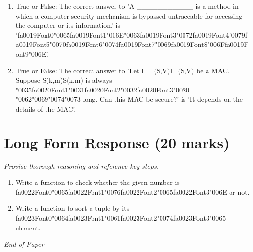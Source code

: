 \documentclass[12pt]{article}
\begin{document}
\begin{enumerate}[label=\arabic*.]
\item True or False: The correct answer to 'A \_\_\_\_\_\_\_\_\_\_\_ is a method in which a computer security mechanism is bypassed untraceable for accessing the computer or its information.' is '{\csname fa0019Font0\endcsname\char"0065}{\csname fa0019Font1\endcsname\char"006E}{\char"0063}{\csname fa0019Font3\endcsname\char"0072}{\csname fa0019Font4\endcsname\char"0079}{\csname fa0019Font5\endcsname\char"0070}{\csname fa0019Font6\endcsname\char"0074}{\csname fa0019Font7\endcsname\char"0069}{\csname fa0019Font8\endcsname\char"006F}{\csname fa0019Font9\endcsname\char"006E}'.
\item True or False: The correct answer to 'Let I = (S,V)I=(S,V) be a MAC. Suppose S(k,m)S(k,m) is always {\char"0035}{\csname fa0020Font1\endcsname\char"0031}{\csname fa0020Font2\endcsname\char"0032}{\csname fa0020Font3\endcsname\char"0020} {\char"0062}{\char"0069}{\char"0074}{\char"0073} long. Can this MAC be secure?' is 'It depends on the details of the MAC'.
\end{enumerate}

\section*{Long Form Response (20 marks)}
\textit{Provide thorough reasoning and reference key steps.}
\begin{enumerate}[label=\arabic*.]
\item Write a function to check whether the given number is {\csname fa0022Font0\endcsname\char"0065}{\csname fa0022Font1\endcsname\char"0076}{\csname fa0022Font2\endcsname\char"0065}{\csname fa0022Font3\endcsname\char"006E} or not.
\item Write a function to sort a tuple by its {\csname fa0023Font0\endcsname\char"0064}{\csname fa0023Font1\endcsname\char"0061}{\csname fa0023Font2\endcsname\char"0074}{\csname fa0023Font3\endcsname\char"0065} element.
\end{enumerate}

\vfill
\noindent\textit{End of Paper}
\end{document}
